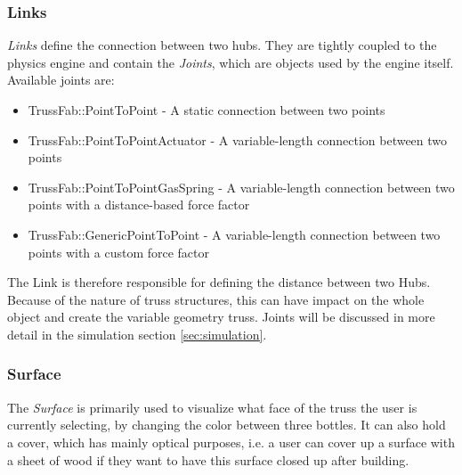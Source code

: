 \subsubsection{Links}
\textit{Links} define the connection between two hubs. They are tightly coupled to the physics engine and contain the \textit{Joints}, which are objects used by the engine itself. Available joints are:
\begin{itemize}
    \item TrussFab::PointToPoint - A static connection between two points
    \item TrussFab::PointToPointActuator - A variable-length connection between two points
    \item TrussFab::PointToPointGasSpring - A variable-length connection between two points with a distance-based force factor
    \item TrussFab::GenericPointToPoint - A variable-length connection between two points with a custom force factor
\end{itemize}
The Link is therefore responsible for defining the distance between two Hubs. Because of the nature of truss structures, this can have impact on the whole object and create the variable geometry truss. Joints will be discussed in more detail in the simulation section \ref{sec:simulation}.

\subsubsection{Surface}
The \textit{Surface} is primarily used to visualize what face of the truss the user is currently selecting, by changing the color between three bottles. It can also hold a cover, which has mainly optical purposes, i.e. a user can cover up a surface with a sheet of wood if they want to have this surface closed up after building.

